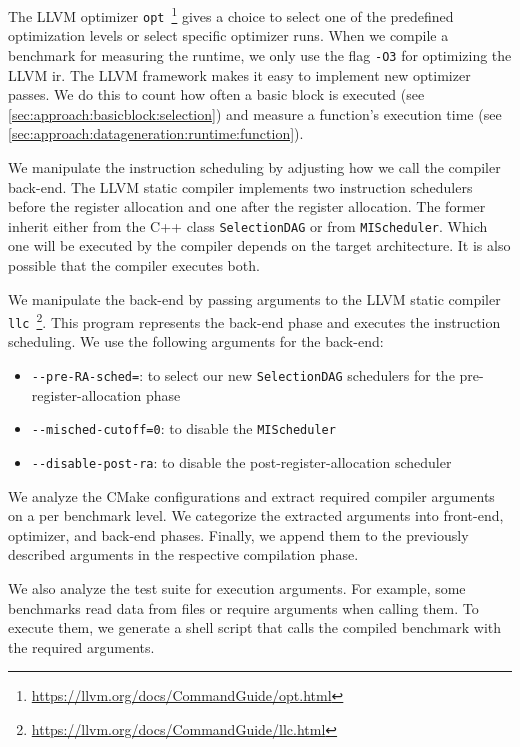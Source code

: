 The LLVM optimizer \lstinline{opt}~\footnote{\url{https://llvm.org/docs/CommandGuide/opt.html}} gives a choice to select one of the predefined optimization levels or select specific optimizer runs.
When we compile a benchmark for measuring the runtime, we only use the flag \lstinline{-O3} for optimizing the LLVM \ac{ir}.
The LLVM framework makes it easy to implement new optimizer passes.
We do this to count how often a basic block is executed (see \cref{sec:approach:basicblock:selection}) and measure a function's execution time (see \cref{sec:approach:datageneration:runtime:function}).

We manipulate the instruction scheduling by adjusting how we call the compiler back-end.
The LLVM static compiler implements two instruction schedulers before the register allocation and one after the register allocation.
The former inherit either from the C++ class \lstinline{SelectionDAG} or from \lstinline{MIScheduler}.
Which one will be executed by the compiler depends on the target architecture. 
It is also possible that the compiler executes both.

We manipulate the back-end by passing arguments to the LLVM static compiler \lstinline{llc}~\footnote{\url{https://llvm.org/docs/CommandGuide/llc.html}}.
This program represents the back-end phase and executes the instruction scheduling.
We use the following arguments for the back-end:
\begin{itemize}
    \item \lstinline{--pre-RA-sched=}: to select our new \lstinline{SelectionDAG} schedulers for the pre-register-allocation phase
    \item \lstinline{--misched-cutoff=0}: to disable the \lstinline{MIScheduler}
    \item \lstinline{--disable-post-ra}: to disable the post-register-allocation scheduler
\end{itemize}

We analyze the CMake configurations and extract required compiler arguments on a per benchmark level.
We categorize the extracted arguments into front-end, optimizer, and back-end phases.
Finally, we append them to the previously described arguments in the respective compilation phase.

We also analyze the test suite for execution arguments.
For example, some benchmarks read data from files or require arguments when calling them.
To execute them, we generate a shell script that calls the compiled benchmark with the required arguments.

